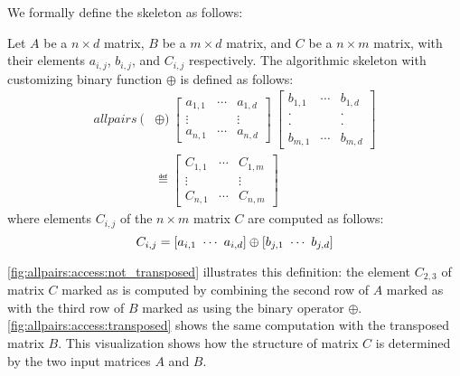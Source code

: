 We formally define the \allpairs skeleton as follows:

\begin{definition}
  \label{def:allpairs}
  Let $A$ be a $n\times d$ matrix, $B$ be a $m\times d$ matrix, and $C$ be a $n\times m$ matrix, with their elements $a_{i,j}$, $b_{i,j}$, and $C_{i,j}$ respectively.
  The algorithmic skeleton \allpairs with customizing binary function $\oplus$ is defined as follows:
  \begin{equation*}
    \begin{split}
    allpairs\ (&\oplus)\
      \left[ \begin{array}{ccc} a_{1,1} & \cdots & a_{1,d}\\[.25em] \vdots & & \vdots\\[.25em] a_{n,1} & \cdots & a_{n,d} \end{array}\right]\ %
      \left[ \begin{array}{ccc} b_{1,1} & \cdots & b_{1,d}\\[-.25em] \cdot & & \cdot\\[-.75em] \cdot & & \cdot\\[-.25em] b_{m,1} & \cdots & b_{m,d} \end{array}\right]%
      \\
    &\eqdef \left[ \begin{array}{ccc} C_{1,1} & \cdots & C_{1,m}\\[.25em] \vdots & & \vdots\\[.25em] C_{n,1} & \cdots & C_{n,m} \end{array} \right]
    \end{split}
  \end{equation*}
  where elements $C_{i,j}$ of the $n\times m$ matrix $C$ are computed as follows:
  \[
    C_{i,j} = \left[a_{i,1}\ \cdots\ a_{i,d}\right] \oplus \left[b_{j,1}\ \cdots\ b_{j,d}\right]
  \]
\end{definition}

\autoref{fig:allpairs:access:not_transposed} illustrates this definition:
the element $C_{2,3}$ of matrix $C$ marked as \circled{3} is computed by combining the second row of $A$ marked as  with the third row of $B$ marked as  using the binary operator $\oplus$.
\autoref{fig:allpairs:access:transposed} shows the same computation with the transposed matrix $B$.
This visualization shows how the structure of matrix $C$ is determined by the two input matrices $A$ and $B$.

